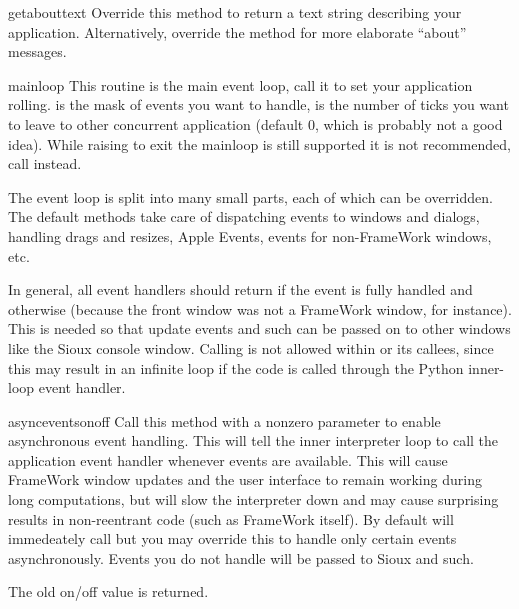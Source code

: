 \begin{funcdesc}{getabouttext}{}
Override this method to return a text string describing your
application.  Alternatively, override the  method
for more elaborate ``about'' messages.
\end{funcdesc}

\begin{funcdesc}{mainloop}{}
This routine is the main event loop, call it to set your application
rolling.  is the mask of events you want to handle,
 is the number of ticks you want to leave to other
concurrent application (default 0, which is probably not a good
idea). While raising  to exit the mainloop is still
supported it is not recommended, call  instead.

The event loop is split into many small parts, each of which can be
overridden. The default methods take care of dispatching events to
windows and dialogs, handling drags and resizes, Apple Events, events
for non-FrameWork windows, etc.

In general, all event handlers should return  if the event is fully
handled and  otherwise (because the front window was not a FrameWork
window, for instance). This is needed so that update events and such
can be passed on to other windows like the Sioux console window.
Calling  is not allowed within
 or its callees, since this may result in an
infinite loop if the code is called through the Python inner-loop
event handler.
\end{funcdesc}

\begin{funcdesc}{asyncevents}{onoff}
Call this method with a nonzero parameter to enable
asynchronous event handling. This will tell the inner interpreter loop
to call the application event handler  whenever events
are available. This will cause FrameWork window updates and the user
interface to remain working during long computations, but will slow the
interpreter down and may cause surprising results in non-reentrant code
(such as FrameWork itself). By default  will immedeately
call  but you may override this to handle only certain
events asynchronously. Events you do not handle will be passed to Sioux
and such.

The old on/off value is returned.
\end{funcdesc}

